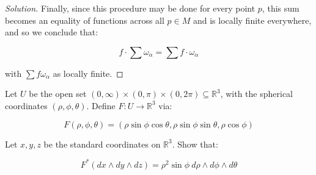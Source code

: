 \documentclass[10pt]{article}
\theoremstyle{nonumberplain}%
\newenvironment{problem}[2][]{\begin{trivlist}
\item[\hskip \labelsep {\bfseries #1}\hskip \labelsep {\bfseries #2.}]}{\end{trivlist}}
\begin{document}
\begin{proof}[Solution]
Finally, since this procedure may be done for every point $p$, this sum becomes an equality of functions across all $p \in M$ and is locally finite everywhere, and so we conclude that:

$$ f \cdot \sum \omega_\alpha = \sum f \cdot \omega_\alpha $$

with $\sum f\omega_\alpha$ as locally finite.

\end{proof}

\begin{problem}{Question 3}

Let $U$ be the open set $(0, \infty) \times (0, \pi) \times (0, 2\pi) \subseteq \mathbb{R}^3$, with the spherical coordinates $(\rho, \phi, \theta)$. Define $F: U \to \mathbb{R}^3$ via:

$$ F(\rho, \phi, \theta) = ( \rho \sin \phi \cos \theta, \rho \sin \phi \sin \theta, \rho \cos \phi)$$

Let $x, y, z$ be the standard coordinates on $\mathbb{R}^3$. Show that:

$$ F^*(dx \wedge dy \wedge dz) = \rho^2 \sin\phi \: d\rho \wedge d\phi \wedge d\theta $$

\end{problem}
\end{document}
